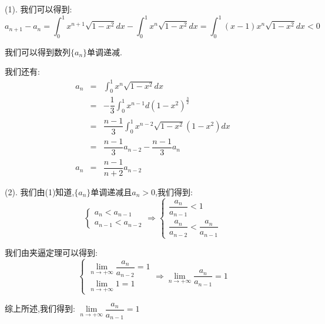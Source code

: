 \begin{anymark}[注]
	(1). 我们可以得到: 
	$$a_{n+1}-a_{n}=\int_{0}^{1}x^{n+1}\sqrt{1-x^2}dx-\int_{0}^{1}x^{n}\sqrt{1-x^2}dx=\int_{0}^{1}(x-1)x^{n}\sqrt{1-x^2}dx<0$$
	
	我们可以得到数列$\{a_{n}\}$单调递减.
	
	我们还有: 
	\begin{eqnarray*}
		a_{n}&=&\int_{0}^{1}x^{n}\sqrt{1-x^2}dx\\
		&=&-\dfrac{1}{3}\int_{0}^{1}x^{n-1}d(1-x^2)^{\frac{3}{2}}\\
		&=&\dfrac{n-1}{3}\int_{0}^{1}x^{n-2}\sqrt{1-x^2}(1-x^2)dx\\
		&=&\dfrac{n-1}{3}a_{n-2}-\dfrac{n-1}{3}a_{n}\\
		a_{n}&=&\dfrac{n-1}{n+2}a_{n-2}
	\end{eqnarray*}
	
	(2). 我们由(1)知道,$\{a_{n}\}$单调递减且$a_{n}>0$,我们得到: 
	$$\left\lbrace
	\begin{array}{l}
		a_{n}<a_{n-1}\\a_{n-1}<a_{n-2}
	\end{array}
	\right. \Rightarrow \left\lbrace
	\begin{array}{l}
		\dfrac{a_{n}}{a_{n-1}}<1\\\dfrac{a_{n}}{a_{n-2}}<\dfrac{a_{n}}{a_{n-1}}
	\end{array}
	\right. $$
	
	我们由夹逼定理可以得到: 
	$$\left\lbrace
	\begin{array}{l}
		\lim\limits_{n\rightarrow +\infty}\dfrac{a_{n}}{a_{n-2}}=1\\
		\lim\limits_{n\rightarrow +\infty}1=1
	\end{array}
	\right. \Rightarrow \lim\limits_{n\rightarrow +\infty}\dfrac{a_{n}}{a_{n-1}}=1$$
	
	综上所述,我们得到: $\lim\limits_{n\rightarrow +\infty}\dfrac{a_{n}}{a_{n-1}}=1$
\end{anymark}

